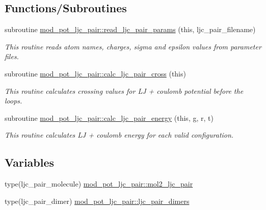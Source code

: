 \subsection*{Functions/\+Subroutines}
\begin{DoxyCompactItemize}
\item 
subroutine \hyperlink{namespacemod__pot__ljc__pair_a0e073ba5b680fbad3e66c6119a8b0a00}{mod\+\_\+pot\+\_\+ljc\+\_\+pair\+::read\+\_\+ljc\+\_\+pair\+\_\+params} (this, ljc\+\_\+pair\+\_\+filename)
\begin{DoxyCompactList}\small\item\em This routine reads atom names, charges, sigma and epsilon values from parameter files. \end{DoxyCompactList}\item 
subroutine \hyperlink{namespacemod__pot__ljc__pair_ae2cc8a028ca8c5488be8c934dec21f61}{mod\+\_\+pot\+\_\+ljc\+\_\+pair\+::calc\+\_\+ljc\+\_\+pair\+\_\+cross} (this)
\begin{DoxyCompactList}\small\item\em This routine calculates crossing values for LJ + coulomb potential before the loops. \end{DoxyCompactList}\item 
subroutine \hyperlink{namespacemod__pot__ljc__pair_ad7983df6d805852c7c2eafd29a09c7a7}{mod\+\_\+pot\+\_\+ljc\+\_\+pair\+::calc\+\_\+ljc\+\_\+pair\+\_\+energy} (this, g, r, t)
\begin{DoxyCompactList}\small\item\em This routine calculates LJ + coulomb energy for each valid configuration. \end{DoxyCompactList}\end{DoxyCompactItemize}
\subsection*{Variables}
\begin{DoxyCompactItemize}
\item 
type(ljc\+\_\+pair\+\_\+molecule) \hyperlink{namespacemod__pot__ljc__pair_af4f6357fdd649043f9ec44f39808a9ca}{mod\+\_\+pot\+\_\+ljc\+\_\+pair\+::mol2\+\_\+ljc\+\_\+pair}
\item 
type(ljc\+\_\+pair\+\_\+dimer) \hyperlink{namespacemod__pot__ljc__pair_ad0c1c41e0227ea0136e97a69257a4132}{mod\+\_\+pot\+\_\+ljc\+\_\+pair\+::ljc\+\_\+pair\+\_\+dimers}
\end{DoxyCompactItemize}
